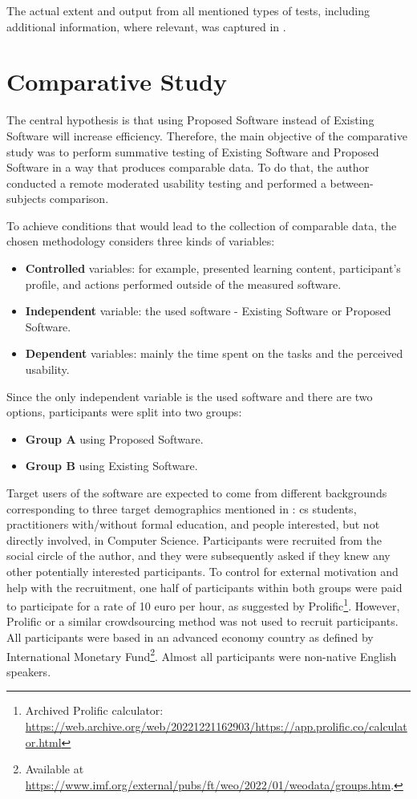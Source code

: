 The actual extent and output from all mentioned types of tests, including additional information, where relevant, was captured in .

\section{Comparative Study}

The central hypothesis is that using Proposed Software instead of Existing Software will increase efficiency.
Therefore, the main objective of the comparative study was to perform summative testing of Existing Software and Proposed Software in a way that produces comparable data.
To do that, the author conducted a remote moderated usability testing and performed a between-subjects comparison.

To achieve conditions that would lead to the collection of comparable data, the chosen methodology considers three kinds of variables:

\begin{itemize}
    \item \textbf{Controlled} variables: for example, presented learning content, participant's profile, and actions performed outside of the measured software.
    \item \textbf{Independent} variable: the used software - Existing Software or Proposed Software.
    \item \textbf{Dependent} variables: mainly the time spent on the tasks and the perceived usability.
\end{itemize}

Since the only independent variable is the used software and there are two options, participants were split into two groups:

\begin{itemize}
    \item \textbf{Group A} using Proposed Software.
    \item \textbf{Group B} using Existing Software.
\end{itemize}

Target users of the software are expected to come from different backgrounds corresponding to three target demographics mentioned in : \gls{cs} students, practitioners with/without formal education, and people interested, but not directly involved, in Computer Science.
Participants were recruited from the social circle of the author, and they were subsequently asked if they knew any other potentially interested participants.
To control for external motivation and help with the recruitment, one half of participants within both groups were paid to participate for a rate of 10 euro per hour, as suggested by Prolific\footnote{Archived Prolific calculator: \url{https://web.archive.org/web/20221221162903/https://app.prolific.co/calculator.html}}.
However, Prolific or a similar crowdsourcing method was not used to recruit participants.
All participants were based in an advanced economy country as defined by International Monetary Fund\footnote{Available at \url{https://www.imf.org/external/pubs/ft/weo/2022/01/weodata/groups.htm}.}.
Almost all participants were non-native English speakers.

